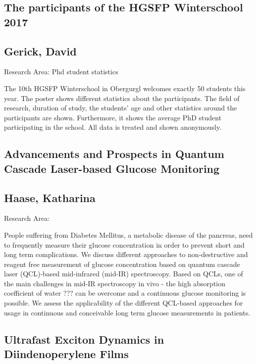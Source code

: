 \subsection*{\centering\normalsize The participants of the HGSFP Winterschool 2017}
\subsection*{\centering\normalsize Gerick, David}
Research Area: Phd student statistics \newline

\noindent The 10th HGSFP Winterschool in Obergurgl welcomes exactly 50 students this year. The poster shows different statistics about the participants. The field of research, duration of study, the students' age and other statistics around the participants are shown. Furthermore, it shows the average PhD student participating in the school. All data is treated and shown anonymously.
\newpage

\subsection*{\centering \large Advancements and Prospects in Quantum Cascade Laser-based Glucose Monitoring}
\subsection*{\centering \normalsize Haase, Katharina}
Research Area: \newline

\noindent People suffering from Diabetes Mellitus, a metabolic disease of the pancreas, need to frequently measure their glucose concentration in order to prevent short and long term complications. We discuss different approaches to non-destructive and reagent free measurement of glucose concentration based on quantum cascade laser (QCL)-based mid-infrared (mid-IR) spectroscopy. Based on QCLs, one of the main challenges in mid-IR spectroscopy in vivo - the high absorption coefficient of water ??? can be overcome and a continuous glucose monitoring is possible. We assess the applicability of the different QCL-based approaches for usage in continuous and conceivable long term glucose measurements in patients.

\subsection*{\centering \large Ultrafast Exciton Dynamics in Diindenoperylene Films}
